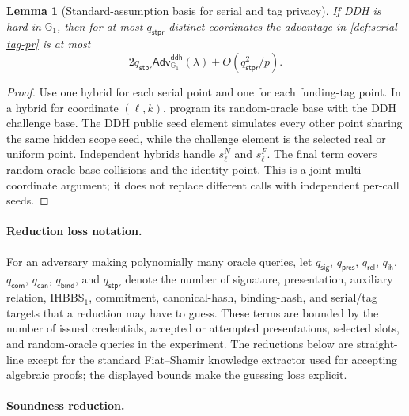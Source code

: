 \documentclass[letterpaper]{article}
\newcommand{\Adv}{\mathsf{Adv}}
\newtheorem{lemma}{Lemma}
\begin{document}
\begin{lemma}[Standard-assumption basis for serial and tag privacy]
\label{lem:serial-tag-ddh}
If DDH is hard in \(\mathbb G_1\), then for at most
\(q_{\mathsf{stpr}}\) distinct coordinates the advantage in
\cref{def:serial-tag-pr} is at most
\[
  2q_{\mathsf{stpr}}\Adv^{\mathsf{ddh}}_{\mathbb G_1}(\lambda)
  +O(q_{\mathsf{stpr}}^2/p).
\]
\end{lemma}

\begin{proof}
Use one hybrid for each serial point and one for each funding-tag point. In a
hybrid for coordinate \((\ell,k)\), program its random-oracle base with the DDH
challenge base. The DDH public seed element simulates every other point sharing
the same hidden scope seed, while the challenge element is the selected real or
uniform point. Independent hybrids handle \(s^N_\ell\) and \(s^F_\ell\). The
final term covers random-oracle base collisions and the identity point. This is
a joint multi-coordinate argument; it does not replace different calls with
independent per-call seeds.
\end{proof}

\paragraph{Reduction loss notation.}
For an adversary making polynomially many oracle queries, let
\(q_{\mathsf{sig}}\), \(q_{\mathsf{pres}}\),
\(q_{\mathsf{rel}}\), \(q_{\mathsf{ih}}\), \(q_{\mathsf{com}}\),
\(q_{\mathsf{can}}\), \(q_{\mathsf{bind}}\), and
\(q_{\mathsf{stpr}}\) denote the number of signature,
presentation, auxiliary relation, IHBBS\(_1\), commitment,
canonical-hash, binding-hash, and serial/tag targets that a reduction may have
to guess. These
terms are bounded by the number of issued credentials, accepted or attempted
presentations, selected slots, and random-oracle queries in the experiment. The
reductions below are straight-line except for the standard Fiat--Shamir
knowledge extractor used for accepting algebraic proofs; the displayed bounds
make the guessing loss explicit.

\paragraph{Soundness reduction.}
\end{document}
